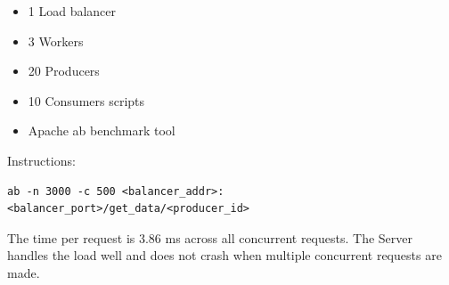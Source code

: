 \documentclass{sigchi}
\begin{document}
\begin{itemize}
  \item 1 Load balancer
  \item 3 Workers
  \item 20 Producers
  \item 10 Consumers scripts
  \item Apache ab benchmark tool
\end{itemize}

Instructions:

\vspace*{\baselineskip}
\begin{lstlisting}[caption={Apache ab testing: instruction}, mathescape, upquote=true]
  ab -n 3000 -c 500 <balancer_addr>:<balancer_port>/get_data/<producer_id>
\end{lstlisting}

The time per request is 3.86 ms across all concurrent requests. The Server handles the load well and does not crash when multiple concurrent requests are made.
\end{document}

